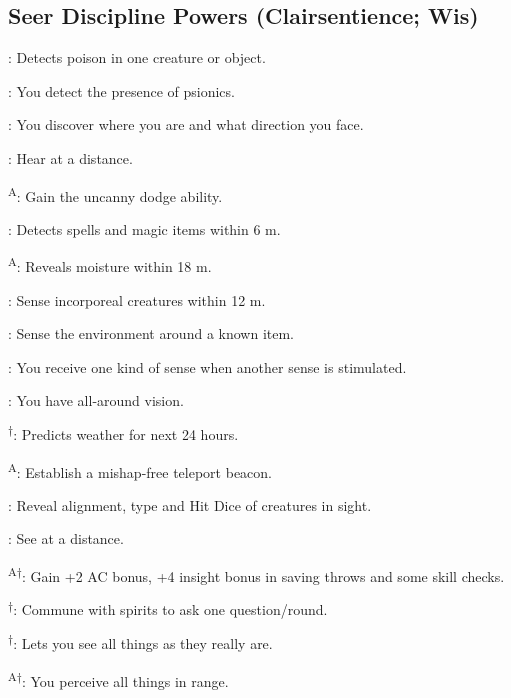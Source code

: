 \subsection{Seer Discipline Powers {\normalsize(Clairsentience; Wis)}}
\begin{enumerate*}
\item {}: Detects poison in one creature or object.

: You detect the presence of psionics.

: You discover where you are and what direction you face.

\item 

\item {}: Hear at a distance.

\textsuperscript{A}: Gain the uncanny dodge ability. %

: Detects spells and magic items within 6 m. %

\textsuperscript{A}: Reveals moisture within 18 m. %

: Sense incorporeal creatures within 12 m. %

: Sense the environment around a known item.

: You receive one kind of sense when another sense is stimulated.

: You have all-around vision.

\textsuperscript{$\dagger$}: Predicts weather for next 24 hours.


\item {}\textsuperscript{A}: Establish a mishap-free teleport beacon.

: Reveal alignment, type and Hit Dice of creatures in sight.

: See at a distance.

\item {}\textsuperscript{A$\dagger$}: Gain +2 AC bonus, +4 insight bonus in saving throws and some skill checks.

\item 
\item 
\item {}\textsuperscript{$\dagger$}: Commune with spirits to ask one question/round.

\textsuperscript{$\dagger$}: Lets you see all things as they really are.

\item {}\textsuperscript{A$\dagger$}: You perceive all things in range. %
\end{enumerate*}



